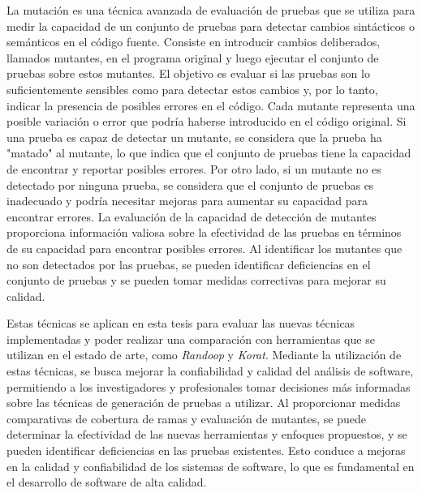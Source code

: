 La mutación es una técnica avanzada de evaluación de pruebas que se utiliza para medir la capacidad de un conjunto de pruebas para detectar cambios sintácticos o semánticos en el código fuente. Consiste en introducir cambios deliberados, llamados mutantes, en el programa original y luego ejecutar el conjunto de pruebas sobre estos mutantes. El objetivo es evaluar si las pruebas son lo suficientemente sensibles como para detectar estos cambios y, por lo tanto, indicar la presencia de posibles errores en el código.
Cada mutante representa una posible variación o error que podría haberse introducido en el código original. Si una prueba es capaz de detectar un mutante, se considera que la prueba ha "matado" al mutante, lo que indica que el conjunto de pruebas tiene la capacidad de encontrar y reportar posibles errores. Por otro lado, si un mutante no es detectado por ninguna prueba, se considera que el conjunto de pruebas es inadecuado y podría necesitar mejoras para aumentar su capacidad para encontrar errores.
La evaluación de la capacidad de detección de mutantes proporciona información valiosa sobre la efectividad de las pruebas en términos de su capacidad para encontrar posibles errores. Al identificar los mutantes que no son detectados por las pruebas, se pueden identificar deficiencias en el conjunto de pruebas y se pueden tomar medidas correctivas para mejorar su calidad.

Estas técnicas se aplican en esta tesis para evaluar las nuevas técnicas implementadas y poder realizar una comparación con herramientas que se utilizan en el estado de arte, como \emph{Randoop} y \emph{Korat}. Mediante la utilización de estas técnicas, se busca mejorar la confiabilidad y calidad del análisis de software, permitiendo a los investigadores y profesionales tomar decisiones más informadas sobre las técnicas de generación de pruebas a utilizar. Al proporcionar medidas comparativas de cobertura de ramas y evaluación de mutantes, se puede determinar la efectividad de las nuevas herramientas y enfoques propuestos, y se pueden identificar deficiencias en las pruebas existentes. Esto conduce a mejoras en la calidad y confiabilidad de los sistemas de software, lo que es fundamental en el desarrollo de software de alta calidad.

